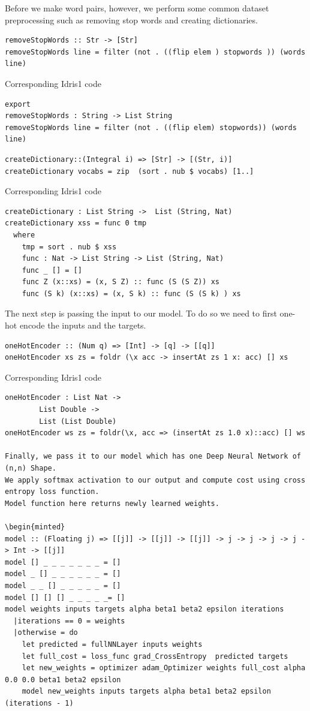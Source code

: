 \documentclass[]{report}
\begin{document}
  
Before we make word pairs, however, we perform some common dataset preprocessing such as removing stop words and creating dictionaries.

\begin{verbatim}
removeStopWords :: Str -> [Str]
removeStopWords line = filter (not . ((flip elem ) stopwords )) (words line)
\end{verbatim}

Corresponding Idris1 code
\begin{verbatim}
export
removeStopWords : String -> List String
removeStopWords line = filter (not . ((flip elem) stopwords)) (words line)
\end{verbatim}

\begin{verbatim}
createDictionary::(Integral i) => [Str] -> [(Str, i)]
createDictionary vocabs = zip  (sort . nub $ vocabs) [1..]
\end{verbatim}

Corresponding Idris1 code
\begin{verbatim}
createDictionary : List String ->  List (String, Nat)
createDictionary xss = func 0 tmp 
  where
    tmp = sort . nub $ xss
    func : Nat -> List String -> List (String, Nat)
    func _ [] = []
    func Z (x::xs) = (x, S Z) :: func (S (S Z)) xs
    func (S k) (x::xs) = (x, S k) :: func (S (S k) ) xs

\end{verbatim}
The next step is passing the input to our model. To do so we need to first one-hot encode the inputs and the targets.

\begin{verbatim}
oneHotEncoder :: (Num q) => [Int] -> [q] -> [[q]]
oneHotEncoder xs zs = foldr (\x acc -> insertAt zs 1 x: acc) [] xs
\end{verbatim}
 
Corresponding Idris1 code
\begin{verbatim}
oneHotEncoder : List Nat -> 
		List Double -> 
		List (List Double)
oneHotEncoder ws zs = foldr(\x, acc => (insertAt zs 1.0 x)::acc) [] ws

Finally, we pass it to our model which has one Deep Neural Network of  (n,n) Shape. 
We apply softmax activation to our output and compute cost using cross entropy loss function. 
Model function here returns newly learned weights.

\begin{minted}
model :: (Floating j) => [[j]] -> [[j]] -> [[j]] -> j -> j -> j -> j -> Int -> [[j]]
model [] _ _ _ _ _ _ _ = []
model _ [] _ _ _ _ _ _ = []
model _ _ [] _ _ _ _ _ = []
model [] [] [] _ _ _ _ _= []
model weights inputs targets alpha beta1 beta2 epsilon iterations 
  |iterations == 0 = weights
  |otherwise = do
    let predicted = fullNNLayer inputs weights
    let full_cost = loss_func grad_CrossEntropy  predicted targets
    let new_weights = optimizer adam_Optimizer weights full_cost alpha 0.0 0.0 beta1 beta2 epsilon
    model new_weights inputs targets alpha beta1 beta2 epsilon (iterations - 1)
\end{verbatim}
\end{document}
